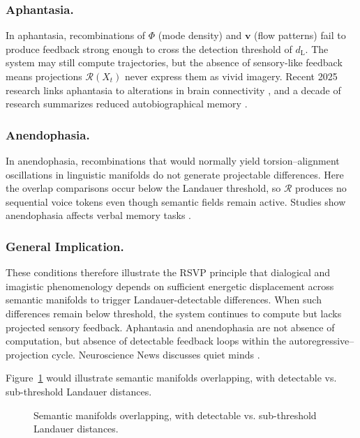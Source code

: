 \documentclass[a4paper,11pt]{article}
\begin{document}
\subsubsection{Aphantasia.}
In aphantasia, recombinations of $\Phi$ (mode density) and $\mathbf{v}$ (flow
patterns) fail to produce feedback strong enough to cross the detection
threshold of $d_{\mathrm{L}}$. The system may still compute trajectories, but
the absence of sensory-like feedback means projections $\mathcal{R}(X_t)$ never
express them as vivid imagery. Recent 2025 research links aphantasia to alterations in brain connectivity \citep{parisbrainaphantasia}, and a decade of research summarizes reduced autobiographical memory \citep{exeteraphantasia}.

\subsubsection{Anendophasia.}
In anendophasia, recombinations that would normally yield torsion--alignment
oscillations in linguistic manifolds do not generate projectable differences.
Here the overlap comparisons occur below the Landauer threshold, so $\mathcal{R}$
produces no sequential voice tokens even though semantic fields remain
active. Studies show anendophasia affects verbal memory tasks \citep{psypostanendophasia}.

\subsubsection{General Implication.}
These conditions therefore illustrate the RSVP principle that dialogical and
imagistic phenomenology depends on sufficient energetic displacement across
semantic manifolds to trigger Landauer-detectable differences. When such
differences remain below threshold, the system continues to compute but lacks
projected sensory feedback. Aphantasia and anendophasia are not absence of
computation, but absence of detectable feedback loops within the
autoregressive--projection cycle. Neuroscience News discusses quiet minds \citep{neurosciencenewsanendophasia}.

Figure~\ref{fig:manifolds} would illustrate semantic manifolds overlapping, with detectable vs. sub-threshold Landauer distances.

\begin{figure}[h]
\centering
\caption{Semantic manifolds overlapping, with detectable vs. sub-threshold Landauer distances.}
\label{fig:manifolds}
\end{figure}
\end{document}
